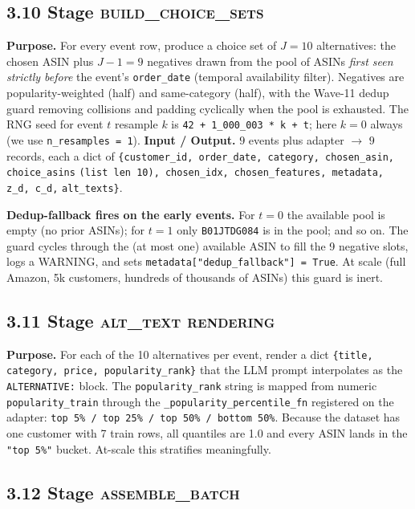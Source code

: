 \documentclass[11pt,a4paper]{article}
\begin{document}
\subsection*{3.10 Stage \textsc{build\_choice\_sets}}

\textbf{Purpose.} For every event row, produce a choice set of
$J = 10$ alternatives: the chosen ASIN plus $J - 1 = 9$ negatives
drawn from the pool of ASINs \emph{first seen strictly before} the
event's \texttt{order\_date} (temporal availability filter). Negatives
are popularity-weighted (half) and same-category (half), with the
Wave-11 dedup guard removing collisions and padding cyclically when
the pool is exhausted. The RNG seed for event $t$ resample $k$ is
\texttt{42 + 1\_000\_003 * k + t}; here $k = 0$ always (we use
\texttt{n\_resamples = 1}).
\textbf{Input / Output.} $9$ events plus adapter $\to$ $9$ records,
each a dict of
\verb|{customer_id, order_date, category, chosen_asin, choice_asins|
\verb|(list len 10), chosen_idx, chosen_features, metadata, z_d, c_d,|
\verb|alt_texts}|.

\textbf{Dedup-fallback fires on the early events.} For $t = 0$ the
available pool is empty (no prior ASINs); for $t = 1$ only
\texttt{B01JTDG084} is in the pool; and so on. The guard cycles
through the (at most one) available ASIN to fill the 9 negative slots,
logs a WARNING, and sets \texttt{metadata["dedup\_fallback"] = True}.
At scale (full Amazon, 5k customers, hundreds of thousands of ASINs)
this guard is inert.

\subsection*{3.11 Stage \textsc{alt\_text rendering}}

\textbf{Purpose.} For each of the 10 alternatives per event, render a
dict \verb|{title, category, price, popularity_rank}| that the LLM
prompt interpolates as the \texttt{ALTERNATIVE:} block. The
\texttt{popularity\_rank} string is mapped from numeric
\texttt{popularity\_train} through the
\texttt{\_popularity\_percentile\_fn} registered on the adapter:
\texttt{top 5\% / top 25\% / top 50\% / bottom 50\%}. Because the
dataset has one customer with 7 train rows, all quantiles are 1.0 and
every ASIN lands in the \texttt{"top 5\%"} bucket. At-scale this
stratifies meaningfully.

\subsection*{3.12 Stage \textsc{assemble\_batch}}
\end{document}
